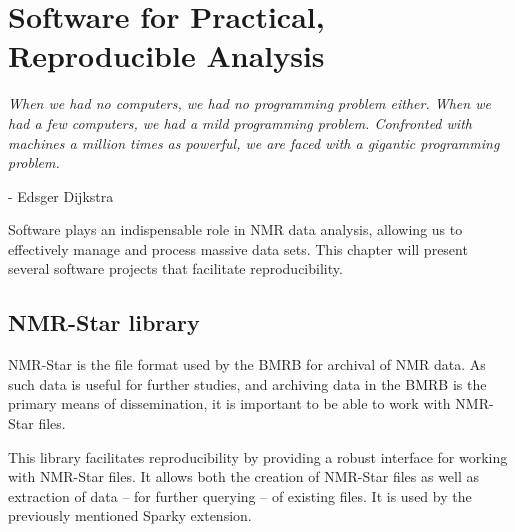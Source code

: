 \chapter{Software for Practical, Reproducible Analysis}

\begin{center}
  \textit{When we had no computers, we had no programming problem either. 
    When we had a few computers, we had a mild programming problem. Confronted 
    with machines a million times as powerful, we are faced with a gigantic 
    programming problem.}

 - Edsger Dijkstra
\end{center}

Software plays an indispensable role in NMR data analysis, allowing us
to effectively manage and process massive data sets.  This chapter will
present several software projects that facilitate reproducibility.

\section{NMR-Star library}
NMR-Star is the file format used by the BMRB \cite{bmrb} for archival of
NMR data.  As such data is useful for further studies, and archiving
data in the BMRB is the primary means of dissemination, it is important
to be able to work with NMR-Star files.

This library facilitates reproducibility by providing a robust interface
for working with NMR-Star files.  It allows both the creation of NMR-Star 
files as well as extraction of data -- for further querying -- of existing
files.  It is used by the previously mentioned Sparky extension.

